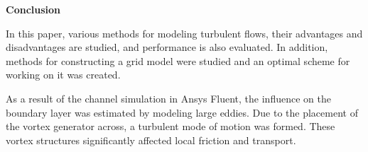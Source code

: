 \begin{center}
	\Large\textbf{Conclusion}
\end{center}

In this paper, various methods for modeling turbulent flows, their advantages and disadvantages are studied, and performance is also evaluated. In addition, methods for constructing a grid model were studied and an optimal scheme for working on it was created.

As a result of the channel simulation in Ansys Fluent, the influence on the boundary layer was estimated by modeling large eddies. Due to the placement of the vortex generator across, a turbulent mode of motion was formed. These vortex structures significantly affected local friction and transport.